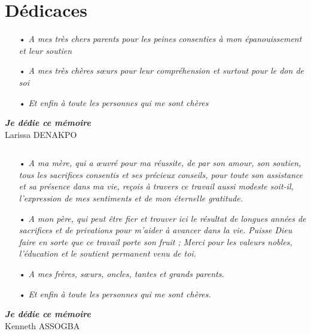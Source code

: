 \chapter{Dédicaces}

\begin{itemize}
\item[•] \textit{A mes très chers parents pour les peines consenties à mon épanouissement et leur soutien}\\
\item[•] \textit{A mes très chères sœurs pour leur compréhension et surtout pour le don de soi}\\
\item[•] \textit{Et enfin à toute les personnes qui me sont chères}\\
\end{itemize}
\begin{flushright}
\textit{ \textbf{Je dédie ce mémoire}}
\\$ $\\
Larissa DENAKPO
\end{flushright}
$ $\\$ $\\$ $\\$ $
\begin{itemize}
\item[•] \textit{A ma mère, qui a œuvré pour ma réussite, de par son amour, son soutien, tous les sacrifices consentis et ses précieux conseils, pour toute son assistance et sa présence dans ma vie, reçois à travers ce travail aussi modeste soit-il, l'expression de mes sentiments et de mon éternelle gratitude.}\\
\item[•] \textit{A mon père, qui peut être fier et trouver ici le résultat de longues années de sacrifices et de privations pour m'aider à avancer dans la vie. Puisse Dieu faire en sorte que ce travail porte son fruit ; Merci pour les valeurs nobles, l'éducation et le soutient permanent venu de toi.}\\
\item[•] \textit{A mes frères, sœurs, oncles, tantes et grands parents.}\\
\item[•] \textit{Et enfin à toute les personnes qui me sont chères.}\\
\end{itemize}
\begin{flushright}
\textit{ \textbf{Je dédie ce mémoire}}
\\$ $\\
Kenneth ASSOGBA
\end{flushright}